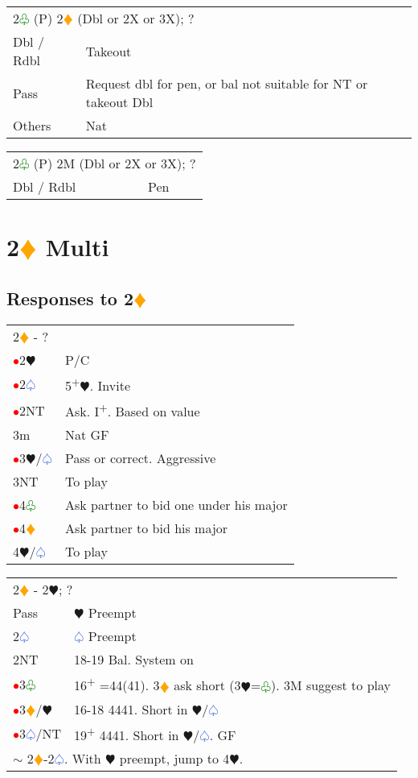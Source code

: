 \documentclass{article}
\renewcommand{\sp}{\textcolor{RoyalBlue}{$\varspade$}}
\newcommand{\he}{\textcolor{RubineRed}{$\varheart$}}
\newcommand{\di}{\textcolor{Orange}{$\vardiamond$}}
\newcommand{\cl}{\textcolor{Green}{$\varclub$}}
\newcommand{\nt}{\relsize{-1}NT\relsize{1}}
\newcommand{\up}{\textsuperscript{+}}
\newcommand{\al}{\textcolor{red}{$\bullet$}}
\begin{document}
\medskip

\begin{tabular}{|l|p{6.5cm}}
	\multicolumn{2}{l}{2\cl{} (P) 2\di{} (Dbl or 2X or 3X); ?}\\
	Dbl / Rdbl & Takeout \\
	Pass & Request dbl for pen, or bal not suitable for \nt{} or takeout Dbl \\
	Others & Nat \\
\end{tabular}

\medskip

\begin{tabular}{|l|p{6.5cm}}
	\multicolumn{2}{l}{2\cl{} (P) 2M (Dbl or 2X or 3X); ?}\\
	Dbl / Rdbl & Pen \\
\end{tabular}

\section{2\di{} Multi}

\subsection{Responses to 2\di{}}

\begin{tabular}{|l|p{6.5cm}}
	\multicolumn{2}{l}{2\di{} - ?}\\
	\al{}2\he{} & P/C \\
	\al{}2\sp{} & 5\up{}\he{}. Invite \\
	\al{}2\nt{} & Ask. I\up{}. Based on value \\
	3m & Nat GF \\
	\al{}3\he{}/\sp{} & Pass or correct. Aggressive \\
	3\nt{} & To play \\
	\al{}4\cl{} & Ask partner to bid one under his major \\
	\al{}4\di{} & Ask partner to bid his major \\
	4\he{}/\sp{} & To play \\
\end{tabular}

\medskip

\begin{tabular}{|l|p{6.5cm}}
	\multicolumn{2}{l}{2\di{} - 2\he{}; ?}\\
	Pass & \he{} Preempt \\
	2\sp{} & \sp{} Preempt \\
	2\nt{} & 18-19 Bal. System on \\
	\al{}3\cl{} & 16\up{} =44(41). 3\di{} ask short (3\he{}=\cl{}). 3M suggest to play \\
	\al{}3\di{}/\he{} & 16-18 4441. Short in \he{}/\sp{} \\
	\al{}3\sp{}/\nt{} & 19\up{} 4441. Short in \he{}/\sp{}. GF \\
	\multicolumn{2}{l}{$\sim$ 2\di{}-2\sp{}. With \he{} preempt, jump to 4\he{}.}
\end{tabular}
\end{document}
